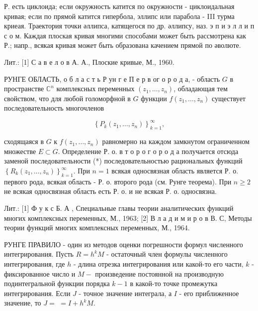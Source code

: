 \documentclass[10pt]{article}
\begin{document}
Р. есть циклоида; если окружность катится по окружности - циклоидальная кривая; если по прямой катится гипербола, эллипс или парабола - III турма криеая. Траектория точки әллипса, катящегося по др. әллипсу, наз. э п и э л л и п с о м. Каждая плоская кривая многими способами может быть рассмотрена как Р.; напр., всякая кривая может быть образована качением прямой по әволюте.



Лит.: [1] С а в е л о в А. А., Плоские кривые, М., 1960.



РУНГЕ ОБЛАСТЬ, о б л а с т ь Р ун г е П е р в ог о р о д а, - область $G$ в пространстве $\mathbb{C}^{n}$ комплексных переменных $\left(z_{1}, \ldots, z_{n}\right)$, обладающая тем свойством, что для любой голоморфной в $G$ функции $f\left(z_{1}, \ldots, z_{n}\right)$ существует последовательность многочленов



\[

\left\{P_{k}\left(z_{1}, \ldots, z_{n}\right)\right\}_{k=1}^{\infty},

\]



сходящаяся в $G$ к $f\left(z_{1}, \ldots, z_{n}\right)$ равномерно на каждом замкнутом ограниченном множестве $E \subset G$. Определение Р. о. в т о р о г о р о д а получается отсюда заменой последовательности (*) последовательностью рациональных функций $\left\{R_{k}\left(z_{1}, \ldots, z_{n}\right)\right\}_{k=1}^{\infty}$. При $n=1$ всякая односвязная область является Р. о. первого рода, всякая область - Р. о. второго рода (см. Рунге теорема). При $n \geqslant 2$ не всякая односвязная область есть Р. о. и не всякая Р. о. односвязна.



Лит.: [1] Ф у к с Б. А , Специальные главы теории аналитических функций многих комплексных переменных, М., 1963; [2] В л а д и м и р о в В. С, Методы теории функций многих комплексных переменных, М., 1964.



РУНГЕ ПРАВИЛО - один из методов оценки погрешности формул численного интегрирования. Пусть $R=h^{k} M$ - остаточный член формулы численного интегрирования, где $h$ - длина отрезка интегрирования или какой-то его части, $k$ - фиксированное число и $M-$ произведение постоянной на производную подинтегральной функции порядка $k-1$ в какой-то точке промежутка интегрирования. Если $J$ - точное значение интеграла, а $I$ - его приближенное значение, то $J=$ $=I+h^{k} M$.
\end{document}
